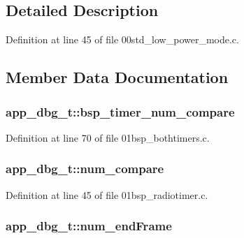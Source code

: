 \subsection{Detailed Description}


Definition at line 45 of file 00std\+\_\+low\+\_\+power\+\_\+mode.\+c.



\subsection{Member Data Documentation}
\subsubsection[{\texorpdfstring{bsp\+\_\+timer\+\_\+num\+\_\+compare}{bsp_timer_num_compare}}]{ app\+\_\+dbg\+\_\+t\+::bsp\+\_\+timer\+\_\+num\+\_\+compare}\hypertarget{structapp__dbg__t_a8854a5958fe805b60c7722d2c9be7ea0}{}\label{structapp__dbg__t_a8854a5958fe805b60c7722d2c9be7ea0}


Definition at line 70 of file 01bsp\+\_\+bothtimers.\+c.

\subsubsection[{\texorpdfstring{num\+\_\+compare}{num_compare}}]{ app\+\_\+dbg\+\_\+t\+::num\+\_\+compare}\hypertarget{structapp__dbg__t_aa14f3f8cab32b7c11b9cf565a6b792de}{}\label{structapp__dbg__t_aa14f3f8cab32b7c11b9cf565a6b792de}


Definition at line 45 of file 01bsp\+\_\+radiotimer.\+c.

\subsubsection[{\texorpdfstring{num\+\_\+end\+Frame}{num_endFrame}}]{ app\+\_\+dbg\+\_\+t\+::num\+\_\+end\+Frame}\hypertarget{structapp__dbg__t_a4e36c7d8e96db35973be86fcc36f17da}{}\label{structapp__dbg__t_a4e36c7d8e96db35973be86fcc36f17da}


